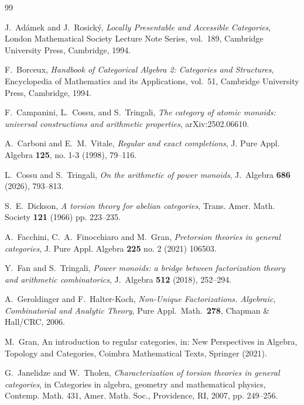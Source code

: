 \documentclass[a4paper,10pt,reqno]{amsart}
\theoremstyle{definition}
\theoremstyle{remark}
\begin{document}
\begin{thebibliography}{99}

J.~Ad\'{a}mek and J.~Rosick\'{y}, \emph{Locally Presentable and Accessible Categories}, London Mathematical Society Lecture Note Series, vol.~189, Cambridge University Press, Cambridge, 1994.


F.~Borceux, \emph{Handbook of Categorical Algebra 2: Categories and Structures}, Encyclopedia of Mathematics and its Applications, vol.~51, Cambridge University Press, Cambridge, 1994.

F.~Campanini, L.~Cossu, and S.~Tringali, \emph{The category of atomic monoids: universal constructions and arithmetic properties}, arXiv:2502.06610.

A.~Carboni and E.~M.~Vitale, \emph{Regular and exact completions}, J. Pure Appl. Algebra \textbf{125}, no. 1-3 (1998), 79--116.

L.~Cossu and S.~Tringali, \emph{On the arithmetic of power monoids}, J.\ Algebra \textbf{686} (2026), 793--813.

S.~E.~Dickson, {\em A torsion theory for abelian categories}, Trans. Amer. Math. Society \textbf{121} (1966) pp. 223--235.

A.~Facchini, C.~A.~Finocchiaro and M.~Gran, {\em Pretorsion theories in general categories}, J. Pure Appl. Algebra \textbf{225} no. 2 (2021) 106503.

Y.~Fan and S.~Tringali, {\em Power monoids: a bridge between factorization theory and arithmetic combinatorics}, J.~Algebra \textbf{512} (2018), 252--294.


A.~Geroldinger and F.~Halter-Koch, {\em Non-Unique Factorizations. Algebraic, Combinatorial and Analytic Theory}, Pure Appl.~Math.~\textbf{278}, Chapman \& Hall/CRC, 2006.

M.~Gran, An introduction to regular categories, in: New Perspectives in Algebra, Topology and Categories, Coimbra Mathematical Texts, Springer (2021).

G.~Janelidze and W.~Tholen, {\em Characterization of torsion theories in general categories}, in Categories in algebra, geometry and mathematical physics, Contemp. Math. 431, Amer. Math. Soc., Providence, RI, 2007, pp. 249--256.
\end{thebibliography}
\end{document}
